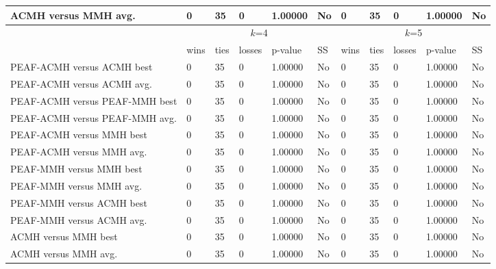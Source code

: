\documentclass[12pt, a4paper]{article}%
\numberwithin{equation}{section}
\theoremstyle{plain}
\begin{document}
{\begin{landscape}
\begin{longtable}{|l|lllll|lllll|}
						ACMH versus MMH avg.                   & 0    & 35   & 0      & 1.00000 & No & 0    & 35   & 0      & 1.00000 & No \\ \hline
						\multicolumn{1}{|c|}{\multirow{2}{*}{}} & \multicolumn{5}{c|}{$k$=4}          & \multicolumn{5}{c|}{$k$=5}          \\ \cline{2-11} 
						\multicolumn{1}{|c|}{}                  & wins & ties & losses & p-value & SS & wins & ties & losses & p-value & SS \\ \hline
						PEAF-ACMH versus ACMH best             & 0    & 35   & 0      & 1.00000 & No & 0    & 35   & 0      & 1.00000 & No \\
						PEAF-ACMH versus ACMH avg.             & 0    & 35   & 0      & 1.00000 & No & 0    & 35   & 0      & 1.00000 & No \\
						PEAF-ACMH versus PEAF-MMH best           & 0    & 35   & 0      & 1.00000 & No & 0    & 35   & 0      & 1.00000 & No \\
						PEAF-ACMH versus PEAF-MMH avg.           & 0    & 35   & 0      & 1.00000 & No & 0    & 35   & 0      & 1.00000 & No \\
						PEAF-ACMH versus MMH best               & 0    & 35   & 0      & 1.00000 & No & 0    & 35   & 0      & 1.00000 & No \\
						PEAF-ACMH versus MMH avg.               & 0    & 35   & 0      & 1.00000 & No & 0    & 35   & 0      & 1.00000 & No \\
						PEAF-MMH versus MMH best                 & 0    & 35   & 0      & 1.00000 & No & 0    & 35   & 0      & 1.00000 & No \\
						PEAF-MMH versus MMH avg.                 & 0    & 35   & 0      & 1.00000 & No & 0    & 35   & 0      & 1.00000 & No \\
						PEAF-MMH versus ACMH best               & 0    & 35   & 0      & 1.00000 & No & 0    & 35   & 0      & 1.00000 & No \\
						PEAF-MMH versus ACMH avg.               & 0    & 35   & 0      & 1.00000 & No & 0    & 35   & 0      & 1.00000 & No \\
						ACMH versus MMH best                   & 0    & 35   & 0      & 1.00000 & No & 0    & 35   & 0      & 1.00000 & No \\
						ACMH versus MMH avg.                   & 0    & 35   & 0      & 1.00000 & No & 0    & 35   & 0      & 1.00000 & No \\ \hline
					\end{longtable}
				\end{landscape}
			}
			
\end{document}
